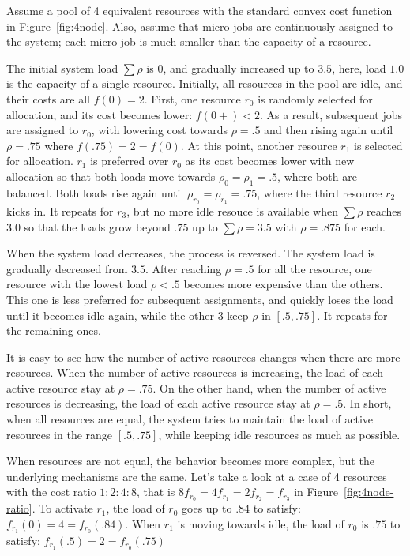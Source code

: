 Assume a pool of 4 equivalent resources with the standard convex
cost function in Figure~\ref{fig:4node}.
Also, assume that micro jobs are continuously assigned to the
system; each micro job is much smaller than the capacity of a
resource.

The initial system load $\sum \rho$ is $0$, and gradually increased
up to $3.5$, here, load $1.0$ is the capacity of a single resource.
Initially, all resources in the pool are idle, and their costs are
all $f(0)= 2$.
First, one resource $r_{0}$ is randomly selected for allocation, and its
cost becomes lower: $f(0+) < 2$. As a result, subsequent jobs are
assigned to $r_{0}$, with lowering cost towards $\rho = .5$ and then
rising again until $\rho = .75$ where $f(.75) = 2 = f(0)$.
At this point, another resource $r_{1}$ is selected for allocation.
$r_{1}$ is preferred over $r_{0}$ as its cost becomes lower with new
allocation so that both loads move towards $\rho_{0} = \rho_{1} = .5$,
where both are balanced.
Both loads rise again until $\rho_{r_{0}} = \rho_{r_{1}} = .75$,
where the third resource $r_{2}$ kicks in.
It repeats for $r_{3}$, but no more idle resouce is available
when $\sum \rho$ reaches $3.0$ so that the loads grow beyond $.75$
up to $\sum \rho = 3.5$ with $\rho = .875$ for each.

When the system load decreases, the process is reversed.
The system load is gradually decreased from $3.5$.
After reaching $\rho = .5$ for all the resource,
one resource with the lowest load $\rho < .5$ becomes more expensive
than the others.
This one is less preferred for subsequent assignments, and quickly
loses the load until it becomes idle again, while the other 3 keep
$\rho$ in $[.5, .75]$. It repeats for the remaining ones.

It is easy to see how the number of active resources changes when
there are more resources.
When the number of active resources is increasing, the load of each
active resource stay at $\rho = .75$.
On the other hand, when the number of active resources is decreasing,
the load of each active resource stay at $\rho = .5$.
In short, when all resources are equal, the system tries to maintain
the load of active resources in the range $[.5, .75]$, while keeping
idle resources as much as possible.

When resources are not equal, the behavior becomes more complex, but
the underlying mechanisms are the same.
Let's take a look at a case of 4 resources with the cost ratio $1:2:4:8$,
that is $8 f_{r_{0}} = 4 f_{r_{1}} = 2 f_{r_{2}} = f_{r_{3}}$ in
Figure~\ref{fig:4node-ratio}.
To activate $r_{1}$, the load of $r_{0}$ goes up to $.84$ to satisfy:
$f_{r_{1}}(0) = 4 = f_{r_{0}}(.84)$.
When $r_{1}$ is moving towards idle, the load of $r_{0}$ is $.75$ to
satisfy: $f_{r_{1}}(.5) = 2 = f_{r_{0}}(.75)$

